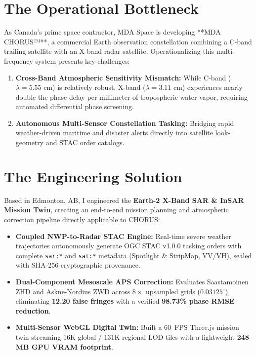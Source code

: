 \documentclass[10pt,letterpaper]{article}
\begin{document}
\noindent
\begin{minipage}[t]{0.51\textwidth}
    \section*{The Operational Bottleneck}
    \footnotesize
    As Canada's prime space contractor, MDA Space is developing **MDA CHORUS™**, a commercial Earth observation constellation combining a C-band trailing satellite with an X-band radar satellite. Operationalizing this multi-frequency system presents key challenges:
    \begin{enumerate}[leftmargin=12pt,topsep=1pt,itemsep=1pt,parsep=0pt]
        \item \textbf{Cross-Band Atmospheric Sensitivity Mismatch:} While C-band ($\lambda = 5.55\text{ cm}$) is relatively robust, X-band ($\lambda = 3.11\text{ cm}$) experiences nearly double the phase delay per millimeter of tropospheric water vapor, requiring automated differential phase screening.
        \item \textbf{Autonomous Multi-Sensor Constellation Tasking:} Bridging rapid weather-driven maritime and disaster alerts directly into satellite look-geometry and STAC order catalogs.
    \end{enumerate}

    \section*{The Engineering Solution}
    \footnotesize
    Based in Edmonton, AB, I engineered the \textbf{Earth-2 X-Band SAR \& InSAR Mission Twin}, creating an end-to-end mission planning and atmospheric correction pipeline directly applicable to CHORUS:
    \begin{itemize}[leftmargin=12pt,topsep=1pt,itemsep=1pt,parsep=0pt]
        \item \textbf{Coupled NWP-to-Radar STAC Engine:} Real-time severe weather trajectories autonomously generate OGC STAC v1.0.0 tasking orders with complete \texttt{sar:*} and \texttt{sat:*} metadata (Spotlight \& StripMap, VV/VH), sealed with SHA-256 cryptographic provenance.
        \item \textbf{Dual-Component Mesoscale APS Correction:} Evaluates Saastamoinen ZHD and Askne-Nordius ZWD across $8\times$ upsampled grids ($0.03125^\circ$), eliminating \textbf{12.20 false fringes} with a verified \textbf{98.73\% phase RMSE reduction}.
        \item \textbf{Multi-Sensor WebGL Digital Twin:} Built a 60~FPS Three.js mission twin streaming 16K global / 131K regional LOD tiles with a lightweight \textbf{248 MB GPU VRAM footprint}.
    \end{itemize}


\end{minipage}
\end{document}

